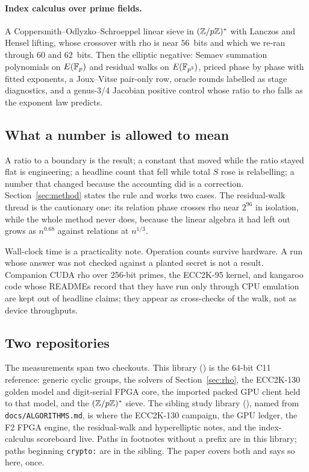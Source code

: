 \paragraph{Index calculus over prime fields.}
A Coppersmith--Odlyzko--Schroeppel linear sieve in $(\mathbb{Z}/p\mathbb{Z})^*$ with
Lanczos and Hensel lifting, whose crossover with rho is near $56$~bits
and which we re-ran through $60$ and $62$~bits. Then the elliptic
negative: Semaev summation polynomials on $E(\mathbb{F}_p)$ and residual walks
on $E(\mathbb{F}_{p^3})$, priced phase by phase with fitted exponents, a
Joux--Vitse pair-only row, oracle rounds labelled as stage diagnostics,
and a genus-3/4 Jacobian positive control whose ratio to rho falls as
the exponent law predicts.

\subsection{What a number is allowed to mean}

A ratio to a boundary is the result; a constant that moved while the
ratio stayed flat is engineering; a headline count that fell while
total $S$ rose is relabelling; a number that changed because the
accounting did is a correction. Section~\ref{sec:method} states the
rule and works two cases. The residual-walk thread is the cautionary
one: its relation phase crosses rho near $2^{96}$ in isolation, while
the whole method never does, because the linear algebra it had left
out grows as $n^{0.68}$ against relations at $n^{1/3}$.

Wall-clock time is a practicality note. Operation counts survive
hardware. A run whose answer was not checked against a planted secret
is not a result. Companion CUDA rho over 256-bit primes, the ECC2K-95
kernel, and kangaroo code whose READMEs record that they have run only
through CPU emulation are kept out of headline claims; they appear as
cross-checks of the walk, not as device throughputs.

\subsection{Two repositories}
\label{sec:tworepos}

The measurements span two checkouts. This library (\thislib) is the
64-bit C11 reference: generic cyclic groups, the solvers of
Section~\ref{sec:rho}, the ECC2K-130 golden model and digit-serial FPGA
core, the imported packed GPU client held to that model, and the
$(\mathbb{Z}/p\mathbb{Z})^*$ sieve. The sibling study library (\sibling), named from
\texttt{docs/ALGORITHMS.md}, is where the ECC2K-130 campaign, the GPU
ledger, the F2 FPGA engine, the residual-walk and hyperelliptic notes,
and the index-calculus scoreboard live. Paths in footnotes without a
prefix are in this library; paths beginning \texttt{crypto:} are in
the sibling. The paper covers both and says so here, once.

